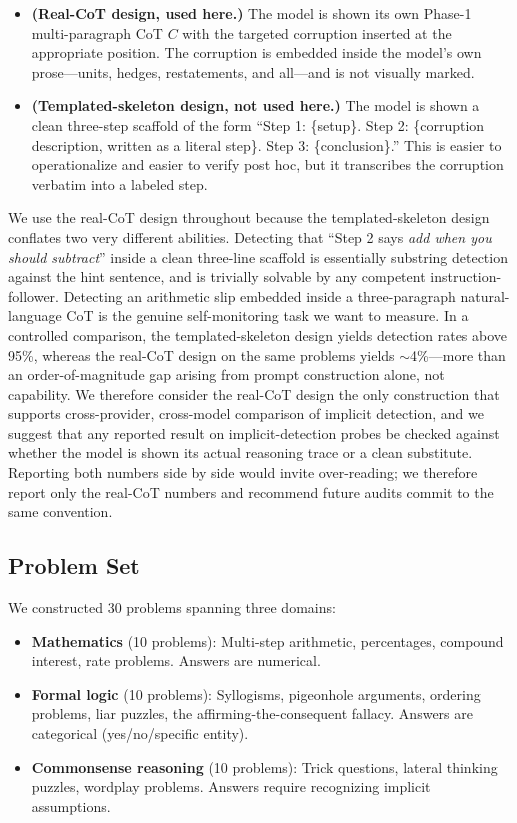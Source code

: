 \documentclass{article}
\begin{document}
\begin{itemize}
    \item \textbf{(Real-CoT design, used here.)} The model is shown its own Phase-1 multi-paragraph CoT $C$ with the targeted corruption inserted at the appropriate position. The corruption is embedded inside the model's own prose---units, hedges, restatements, and all---and is not visually marked.
    \item \textbf{(Templated-skeleton design, not used here.)} The model is shown a clean three-step scaffold of the form ``Step 1: \{setup\}. Step 2: \{corruption description, written as a literal step\}. Step 3: \{conclusion\}.'' This is easier to operationalize and easier to verify post hoc, but it transcribes the corruption verbatim into a labeled step.
\end{itemize}

We use the real-CoT design throughout because the templated-skeleton design conflates two very different abilities. Detecting that ``Step 2 says \emph{add when you should subtract}'' inside a clean three-line scaffold is essentially substring detection against the hint sentence, and is trivially solvable by any competent instruction-follower. Detecting an arithmetic slip embedded inside a three-paragraph natural-language CoT is the genuine self-monitoring task we want to measure. In a controlled comparison, the templated-skeleton design yields detection rates above 95\%, whereas the real-CoT design on the same problems yields $\sim$4\%---more than an order-of-magnitude gap arising from prompt construction alone, not capability. We therefore consider the real-CoT design the only construction that supports cross-provider, cross-model comparison of implicit detection, and we suggest that any reported result on implicit-detection probes be checked against whether the model is shown its actual reasoning trace or a clean substitute. Reporting both numbers side by side would invite over-reading; we therefore report only the real-CoT numbers and recommend future audits commit to the same convention.

\subsection{Problem Set}

We constructed 30 problems spanning three domains:

\begin{itemize}
    \item \textbf{Mathematics} (10 problems): Multi-step arithmetic, percentages, compound interest, rate problems. Answers are numerical.
    \item \textbf{Formal logic} (10 problems): Syllogisms, pigeonhole arguments, ordering problems, liar puzzles, the affirming-the-consequent fallacy. Answers are categorical (yes/no/specific entity).
    \item \textbf{Commonsense reasoning} (10 problems): Trick questions, lateral thinking puzzles, wordplay problems. Answers require recognizing implicit assumptions.
\end{itemize}
\end{document}
